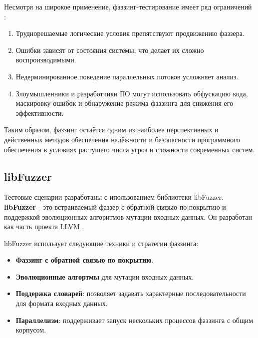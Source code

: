 Несмотря на широкое применение, фаззинг-тестирование имеет ряд ограничений \cite{Kuliamin}\cite{Boehme}:
\begin{enumerate}
	\item Труднорешаемые логические условия препятствуют продвижению фаззера.
	\item Ошибки зависят от состояния системы, что делает их сложно воспроизводимыми.
	\item Недерминированное поведение параллельных потоков усложняет анализ.
	\item Злоумышленники и разработчики ПО могут использовать обфускацию кода, маскировку ошибок и обнаружение режима фаззинга для снижения его эффективности.
\end{enumerate}

Таким образом, фаззинг остаётся одним из наиболее перспективных и действенных методов обеспечения надёжности и безопасности программного обеспечения в условиях растущего числа угроз и сложности современных систем.

\subsection{libFuzzer}
Тестовые сценарии разработаны с ипользованием библиотеки libFuzzer. \textbf{libFuzzer} - это встраиваемый фаззер с обратной связью по покрытию и поддержкой эволюционных алгоритмов мутации входных данных. Он разработан как часть проекта LLVM \cite{Libfuzzer}.

libFuzzer использует следующие техники и стратегии фаззинга:
\begin{itemize}
	\item \textbf{Фаззинг с обратной связью по покрытию}.
	\item \textbf{Эволюционные алгортмы} для мутации входных данных.
	\item \textbf{Поддержка словарей}: позволяет задавать характерные последовательности для формата входных данных.
	\item \textbf{Параллелизм}: поддерживает запуск нескольких процессов фаззинга с общим корпусом.
\end{itemize}


